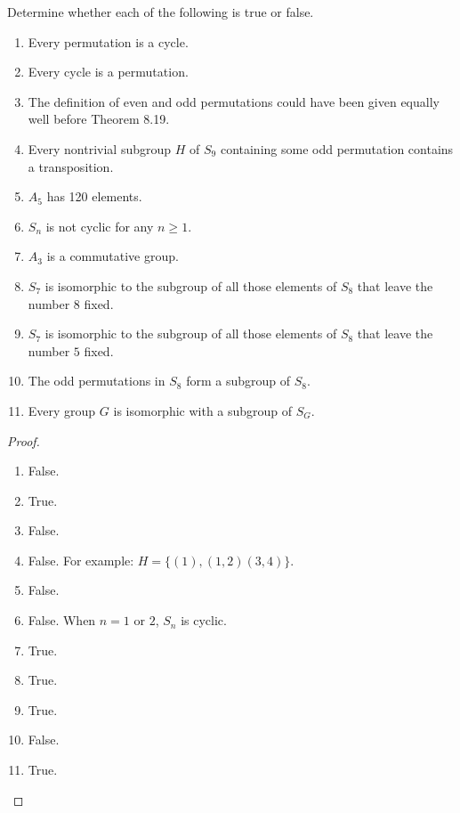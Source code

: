 \begin{exercise}
    Determine whether each of the following is true or false.
    \begin{enumerate}[label={\textbf{\alph*.}}]
        \item Every permutation is a cycle.
        \item Every cycle is a permutation.
        \item The definition of even and odd permutations could have been given equally well before Theorem 8.19.
        \item Every nontrivial subgroup $H$ of $S_{9}$ containing some odd permutation contains a transposition.
        \item $A_{5}$ has 120 elements.
        \item $S_{n}$ is not cyclic for any $n\geq 1$.
        \item $A_{3}$ is a commutative group.
        \item $S_{7}$ is isomorphic to the subgroup of all those elements of $S_{8}$ that leave the number $8$ fixed.
        \item $S_{7}$ is isomorphic to the subgroup of all those elements of $S_{8}$ that leave the number $5$ fixed.
        \item The odd permutations in $S_{8}$ form a subgroup of $S_{8}$.
        \item Every group $G$ is isomorphic with a subgroup of $S_{G}$.
    \end{enumerate}
\end{exercise}

\begin{proof}
    \begin{enumerate}[label={\textbf{\alph*.}}]
        \item False.
        \item True.
        \item False.
        \item False. For example: $H = \{ (1), (1,2)(3,4) \}$.
        \item False.
        \item False. When $n = 1$ or $2$, $S_{n}$ is cyclic.
        \item True.
        \item True.
        \item True.
        \item False.
        \item True.
    \end{enumerate}
\end{proof}

